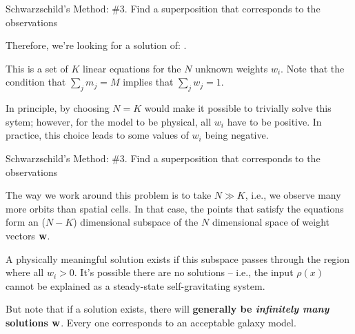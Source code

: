 \documentclass[letterpaper,landscape]{slides}
\begin{document}
\begin{slide}
\begin{center}
{\large \color{red} 
                  Schwarzschild's Method: \#3. Find a superposition that
corresponds to the observations  }
\end{center}

Therefore, we're looking for a solution of:
.

This is a set of $K$ linear equations for the $N$ unknown weights $w_i$. 
Note that the condition that $\sum_j m_j = M$ implies that $\sum_j w_j = 1$.

In principle, by choosing $N = K$ would make it possible to trivially solve
this sytem; however, for the model to be physical, all $w_i$ have to be
positive. In practice, this choice leads to some values of $w_i$ being
negative.

\vfill
\end{slide}

\begin{slide}
\begin{center}
{\large \color{red} 
                  Schwarzschild's Method: \#3. Find a superposition that
corresponds to the observations  }
\end{center}

The way we work around this problem is to take $N \gg K$, i.e., we observe
many more orbits than spatial cells. In that case, the points that satisfy
the equations form an ($N - K$) dimensional subspace of the $N$ dimensional
space of weight vectors ${\bf w}$.

A physically meaningful solution exists if this subspace passes through the
region where all $w_i > 0$. It's possible there are no solutions -- i.e.,
the input $\rho(x)$ cannot be explained as a steady-state self-gravitating
system.

But note that if a solution exists, there will {\bf generally be {\em infinitely
many} solutions ${\bf w}$}. Every one corresponds to an acceptable galaxy
model.

\vfill
\end{slide}
\end{document}
